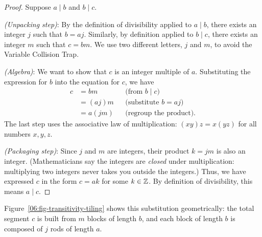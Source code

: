 \begin{proof}
Suppose $a \mid b$ and $b \mid c$. 

\emph{(Unpacking step)}: By the definition of divisibility applied to $a \mid b$, there exists an integer $j$ such that $b = aj$. Similarly, by definition applied to $b \mid c$, there exists an integer $m$ such that $c = bm$. We use two different letters, $j$ and $m$, to avoid the Variable Collision Trap.

\emph{(Algebra)}: We want to show that $c$ is an integer multiple of $a$. Substituting the expression for $b$ into the equation for $c$, we have
\begin{align*}
c &= bm   && \text{(from $b \mid c$)}\\
  &= (aj)m && \text{(substitute $b = aj$)}\\
  &= a(jm) && \text{(regroup the product)}.
\end{align*}
The last step uses the associative law of multiplication: $(xy)z = x(yz)$ for all numbers $x, y, z$.

\emph{(Packaging step)}: Since $j$ and $m$ are integers, their product $k = jm$ is also an integer. (Mathematicians say the integers are \emph{closed} under multiplication: multiplying two integers never takes you outside the integers.) Thus, we have expressed $c$ in the form $c = ak$ for some $k \in \mathbb{Z}$. By definition of divisibility, this means $a \mid c$.
\end{proof}

Figure~\ref{06:fig-transitivity-tiling} shows this substitution geometrically: the total segment $c$ is built from $m$ blocks of length $b$, and each block of length $b$ is composed of $j$ rods of length $a$.

